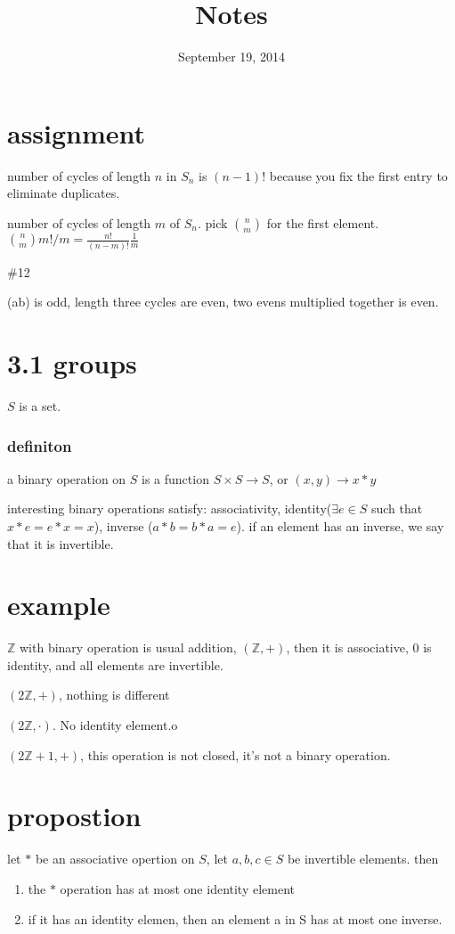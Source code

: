 \documentclass[letterpaper]{article}
\begin{document}
\title{Notes}
\date{September 19, 2014}
\maketitle
\section*{assignment}
number of cycles of length  $n$ in $S_n$ is $(n-1)!$ because you fix the first entry to eliminate duplicates.

number of cycles of length $m$ of $S_n$. pick $\binom{n}{m}$ for the first element. $\binom{n}{m}m!/m=\frac{n!}{(n-m)!}\frac{1}{m}$

\#12

(ab) is odd, length three cycles are even, two evens multiplied together is even.

\section*{3.1 groups}
$S$ is a set.
\subsubsection*{definiton}a binary operation on $S$ is a function $S\times S\to S$, or $(x,y)\to x*y$

interesting binary operations satisfy: associativity, identity($\exists e\in S$ such that $x*e=e*x=x$), inverse ($a*b=b*a=e$). if an element has an inverse, we say that it is invertible.

\section*{example}
$\mathbb{Z}$ with binary operation is usual addition, $(\mathbb{Z},+)$, then it is associative, $0$ is identity, and all elements are invertible.

$(2\mathbb{Z},+)$, nothing is different

$(2\mathbb{Z},\cdot)$. No identity element.o

$(2\mathbb{Z}+1,+)$, this operation is not closed, it's not a binary operation.

\section*{propostion}
let $*$ be an associative opertion on $S$, let $a,b,c\in S$ be invertible elements. then
\begin{enumerate}
\item
the $*$ operation has at most one identity element
\item
if it has an identity elemen, then an element a in S has at most one inverse.
\end{enumerate}
\end{document}
